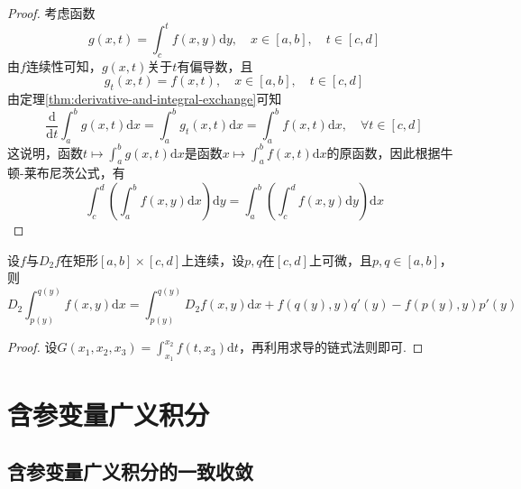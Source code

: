 \begin{proof}
    考虑函数
    \[
    g(x,t)=\int_c^t f(x,y)\mathrm{d} y,\quad x\in[a,b],\quad t\in[c,d]
    \]
    由$f$连续性可知，$g(x,t)$关于$t$有偏导数，且
    \[
        g_t(x,t)=f(x,t),\quad x\in[a,b],\quad t\in[c,d]
    \]
    由定理\ref{thm:derivative-and-integral-exchange}可知
    \[
    \frac{\mathrm{d}}{\mathrm{d}t}\int_a^b g(x,t) \mathrm{d}x=\int_a^b g_t(x,t) \mathrm{d}x=\int_a^b f(x,t) \mathrm{d}x,\quad \forall t\in[c,d]
    \]
    这说明，函数$t\mapsto \int_a^b g(x,t)\mathrm{d}x$是函数$x\mapsto \int_a^b f(x,t)\mathrm{d}x$的原函数，因此根据牛顿-莱布尼茨公式，有
    \[
        \int_c^d \left(\int_a^b f(x,y)\mathrm{d} x\right)\mathrm{d} y = \int_a^b \left(\int_c^d f(x,y)\mathrm{d} y\right)\mathrm{d} x
    \]
\end{proof}

\begin{theorem}[含参积分求导公式]\label{thm:derivative-of-integral-with-parameter}
    设$f$与$D_2f$在矩形$[a,b]\times [c,d]$上连续，设$p,q$在$[c,d]$上可微，且$p,q\in[a,b]$，则
    \[
        D_2\int_{p(y)}^{q(y)} f(x,y)\mathrm{d} x = \int_{p(y)}^{q(y)} D_2f(x,y)\mathrm{d} x +f(q(y),y)q'(y)-f(p(y),y)p'(y)
    \]
\end{theorem}

\begin{proof}
    设$G(x_1,x_2,x_3)=\int_{x_1}^{x_2}f(t,x_3)\mathrm{d} t$，再利用求导的链式法则即可.
\end{proof}

\section{含参变量广义积分}

\subsection{含参变量广义积分的一致收敛}

